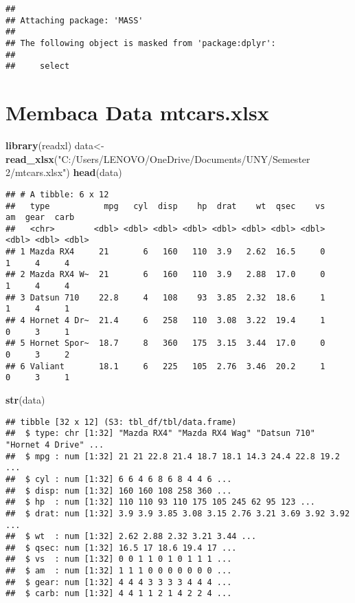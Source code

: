 \documentclass[
]{article}
\newenvironment{Shaded}{\begin{snugshade}}{\end{snugshade}}
\newcommand{\FunctionTok}[1]{\textcolor[rgb]{0.13,0.29,0.53}{\textbf{#1}}}
\newcommand{\NormalTok}[1]{#1}
\newcommand{\OtherTok}[1]{\textcolor[rgb]{0.56,0.35,0.01}{#1}}
\newcommand{\StringTok}[1]{\textcolor[rgb]{0.31,0.60,0.02}{#1}}
\begin{document}
\begin{verbatim}
## 
## Attaching package: 'MASS'
## 
## The following object is masked from 'package:dplyr':
## 
##     select
\end{verbatim}

\section{Membaca Data mtcars.xlsx}\label{membaca-data-mtcars.xlsx}

\begin{Shaded}
\begin{Highlighting}[]
\FunctionTok{library}\NormalTok{(readxl)}
\NormalTok{data}\OtherTok{\textless{}{-}} \FunctionTok{read\_xlsx}\NormalTok{(}\StringTok{"C:/Users/LENOVO/OneDrive/Documents/UNY/Semester 2/mtcars.xlsx"}\NormalTok{)}
\FunctionTok{head}\NormalTok{(data)}
\end{Highlighting}
\end{Shaded}

\begin{verbatim}
## # A tibble: 6 x 12
##   type           mpg   cyl  disp    hp  drat    wt  qsec    vs    am  gear  carb
##   <chr>        <dbl> <dbl> <dbl> <dbl> <dbl> <dbl> <dbl> <dbl> <dbl> <dbl> <dbl>
## 1 Mazda RX4     21       6   160   110  3.9   2.62  16.5     0     1     4     4
## 2 Mazda RX4 W~  21       6   160   110  3.9   2.88  17.0     0     1     4     4
## 3 Datsun 710    22.8     4   108    93  3.85  2.32  18.6     1     1     4     1
## 4 Hornet 4 Dr~  21.4     6   258   110  3.08  3.22  19.4     1     0     3     1
## 5 Hornet Spor~  18.7     8   360   175  3.15  3.44  17.0     0     0     3     2
## 6 Valiant       18.1     6   225   105  2.76  3.46  20.2     1     0     3     1
\end{verbatim}

\begin{Shaded}
\begin{Highlighting}[]
\FunctionTok{str}\NormalTok{(data)}
\end{Highlighting}
\end{Shaded}

\begin{verbatim}
## tibble [32 x 12] (S3: tbl_df/tbl/data.frame)
##  $ type: chr [1:32] "Mazda RX4" "Mazda RX4 Wag" "Datsun 710" "Hornet 4 Drive" ...
##  $ mpg : num [1:32] 21 21 22.8 21.4 18.7 18.1 14.3 24.4 22.8 19.2 ...
##  $ cyl : num [1:32] 6 6 4 6 8 6 8 4 4 6 ...
##  $ disp: num [1:32] 160 160 108 258 360 ...
##  $ hp  : num [1:32] 110 110 93 110 175 105 245 62 95 123 ...
##  $ drat: num [1:32] 3.9 3.9 3.85 3.08 3.15 2.76 3.21 3.69 3.92 3.92 ...
##  $ wt  : num [1:32] 2.62 2.88 2.32 3.21 3.44 ...
##  $ qsec: num [1:32] 16.5 17 18.6 19.4 17 ...
##  $ vs  : num [1:32] 0 0 1 1 0 1 0 1 1 1 ...
##  $ am  : num [1:32] 1 1 1 0 0 0 0 0 0 0 ...
##  $ gear: num [1:32] 4 4 4 3 3 3 3 4 4 4 ...
##  $ carb: num [1:32] 4 4 1 1 2 1 4 2 2 4 ...
\end{verbatim}
\end{document}
